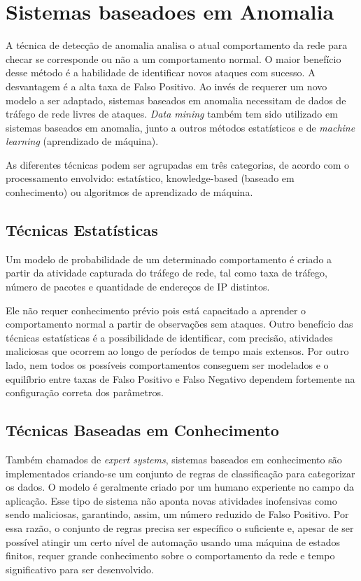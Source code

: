 \chapter{Sistemas baseadoes em Anomalia}
\label{ch:anids}
 A técnica de detecção de anomalia analisa o atual comportamento da rede para checar se corresponde ou não a um
 comportamento normal. O maior benefício desse método é a habilidade de identificar novos ataques com sucesso.
 A desvantagem é a alta taxa de Falso Positivo. Ao invés de requerer um novo modelo a ser adaptado, sistemas baseados
 em anomalia necessitam de dados de tráfego de rede livres de ataques. \textit{Data mining} também tem sido
 utilizado em sistemas baseados em anomalia, junto a outros métodos estatísticos e de \textit{machine learning}
 (aprendizado de máquina).
 \par As diferentes técnicas podem ser agrupadas em três categorias, de acordo com o processamento envolvido:
 estatístico, knowledge-based (baseado em conhecimento) ou algoritmos de aprendizado de máquina.

\section{Técnicas Estatísticas}
Um modelo de probabilidade de um determinado comportamento é criado a partir da atividade capturada do tráfego de rede,
 tal como taxa de tráfego, número de pacotes e quantidade de endereços de IP distintos.
 \par Ele não requer conhecimento prévio pois está capacitado a aprender o comportamento normal a partir de observações
 sem ataques. Outro benefício das técnicas estatísticas é a possibilidade de identificar, com precisão, atividades
 maliciosas que ocorrem ao longo de períodos de tempo mais extensos. Por outro lado, nem todos os possíveis
 comportamentos conseguem ser modelados e o equilíbrio entre taxas de Falso Positivo e Falso Negativo dependem
 fortemente na configuração correta dos parâmetros.

 \section{Técnicas Baseadas em Conhecimento}
 Também chamados de \emph{expert systems}, sistemas baseados em conhecimento são implementados criando-se um conjunto de
 regras de classificação para categorizar os dados. O modelo é geralmente criado por um humano experiente no campo
 da aplicação. Esse tipo de sistema não aponta novas atividades inofensivas como sendo maliciosas, garantindo, assim,
 um número reduzido de Falso Positivo. Por essa razão, o conjunto de regras precisa ser específico o suficiente e,
 apesar de ser possível atingir um certo nível de automação usando uma máquina de estados finitos, requer
 grande conhecimento sobre o comportamento da rede e tempo significativo para ser desenvolvido.

